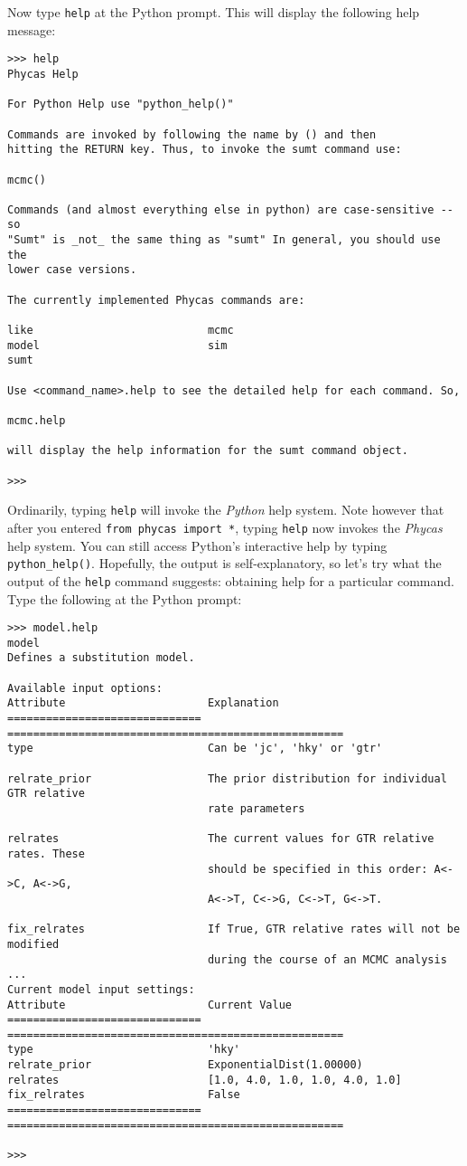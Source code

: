 \documentclass[10pt]{article}
\newcommand{\code}[1]{{\tt #1}}				%
\newcommand{\cmd}[1]{{\tt \small #1}\index{#1}}		%
\begin{document}
Now type \cmd{help} at the Python prompt. This will display the following help message:
\begin{verbatim}
>>> help
Phycas Help
    
For Python Help use "python_help()"

Commands are invoked by following the name by () and then
hitting the RETURN key. Thus, to invoke the sumt command use:

mcmc()

Commands (and almost everything else in python) are case-sensitive -- so
"Sumt" is _not_ the same thing as "sumt" In general, you should use the
lower case versions.

The currently implemented Phycas commands are:
  
like                           mcmc
model                          sim
sumt                           

Use <command_name>.help to see the detailed help for each command. So,

mcmc.help

will display the help information for the sumt command object.

>>> 
\end{verbatim}

Ordinarily, typing \cmd{help} will invoke the {\em Python} help system. Note however that after you entered \code{from phycas import *}, typing \cmd{help} now invokes the {\em Phycas} help system. You can still access Python's interactive help by typing \cmd{python\_help()}. Hopefully, the output is self-explanatory, so let's try what the output of the \cmd{help} command suggests: obtaining help for a particular command. Type the following at the Python prompt:
\begin{verbatim}
>>> model.help
model
Defines a substitution model.

Available input options:
Attribute                      Explanation
============================== ====================================================
type                           Can be 'jc', 'hky' or 'gtr'

relrate_prior                  The prior distribution for individual GTR relative
                               rate parameters

relrates                       The current values for GTR relative rates. These 
                               should be specified in this order: A<->C, A<->G, 
                               A<->T, C<->G, C<->T, G<->T.

fix_relrates                   If True, GTR relative rates will not be modified
                               during the course of an MCMC analysis
...
Current model input settings:
Attribute                      Current Value
============================== ====================================================
type                           'hky'
relrate_prior                  ExponentialDist(1.00000)
relrates                       [1.0, 4.0, 1.0, 1.0, 4.0, 1.0]
fix_relrates                   False
============================== ====================================================

>>> 
\end{verbatim}
\end{document}
